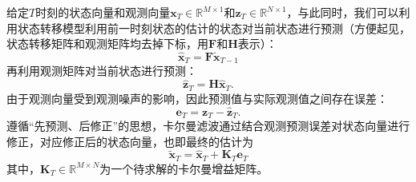 给定\( T \)时刻的状态向量和观测向量\( \bm{x}_T \in \mathbb{R}^{M \times 1} \)和\( \bm{z}_T \in \mathbb{R}^{N \times 1} \)，与此同时，我们可以利用状态转移模型利用前一时刻状态的估计的状态对当前状态进行预测（方便起见，状态转移矩阵和观测矩阵均去掉下标，用\( \mathbf{F} \)和\( \mathbf{H} \)表示）：
\[
    \hat{\bm{x}}_{T} = \mathbf{F} \tilde{\bm{x}}_{T-1}
\]
再利用观测矩阵对当前状态进行预测：
\[
    \hat{\bm{z}}_{T} = \mathbf{H} \hat{\bm{x}}_{T}.
\]
由于观测向量受到观测噪声的影响，因此预测值与实际观测值之间存在误差：
\[
    \bm{e}_T = \bm{z}_T - \hat{\bm{z}}_T.
\]
遵循``先预测、后修正''的思想，卡尔曼滤波通过结合观测预测误差对状态向量进行修正，对应修正后的状态向量，也即最终的估计为
\[
    \tilde{\bm{x}}_T = \hat{\bm{x}}_T + \mathbf{K}_T \bm{e}_T
\]
其中，\( \mathbf{K}_T \in \mathbb{R}^{M \times N} \)为一个待求解的卡尔曼增益矩阵。

